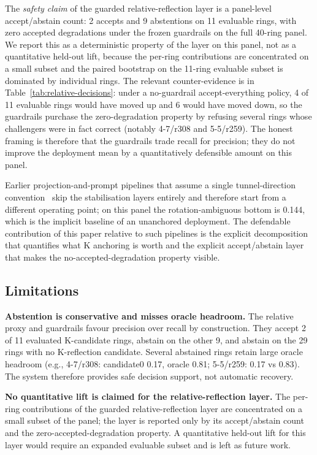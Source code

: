 \documentclass[a4paper,fleqn]{cas-dc}
\begin{document}
The \emph{safety claim} of the guarded relative-reflection layer is a panel-level accept/abstain count: 2 accepts and 9 abstentions on 11 evaluable rings, with zero accepted degradations under the frozen guardrails on the full 40-ring panel. We report this as a deterministic property of the layer on this panel, not as a quantitative held-out lift, because the per-ring contributions are concentrated on a small subset and the paired bootstrap on the 11-ring evaluable subset is dominated by individual rings. The relevant counter-evidence is in Table~\ref{tab:relative-decisions}: under a no-guardrail accept-everything policy, 4 of 11 evaluable rings would have moved up and 6 would have moved down, so the guardrails purchase the zero-degradation property by refusing several rings whose challengers were in fact correct (notably 4-7/r308 and 5-5/r259). The honest framing is therefore that the guardrails trade recall for precision; they do not improve the deployment mean by a quantitatively defensible amount on this panel.

Earlier projection-and-prompt pipelines that assume a single tunnel-direction convention~\cite{ye2025sam4tun} skip the stabilisation layers entirely and therefore start from a different operating point; on this panel the rotation-ambiguous bottom is 0.144, which is the implicit baseline of an unanchored deployment. The defendable contribution of this paper relative to such pipelines is the explicit decomposition that quantifies what K anchoring is worth and the explicit accept/abstain layer that makes the no-accepted-degradation property visible.

\subsection{Limitations}\label{sec:limitations}

\textbf{Abstention is conservative and misses oracle headroom.} The relative proxy and guardrails favour precision over recall by construction. They accept 2 of 11 evaluated K-candidate rings, abstain on the other 9, and abstain on the 29 rings with no K-reflection candidate. Several abstained rings retain large oracle headroom (e.g., 4-7/r308: candidate0 0.17, oracle 0.81; 5-5/r259: 0.17 vs 0.83). The system therefore provides safe decision support, not automatic recovery.

\textbf{No quantitative lift is claimed for the relative-reflection layer.} The per-ring contributions of the guarded relative-reflection layer are concentrated on a small subset of the panel; the layer is reported only by its accept/abstain count and the zero-accepted-degradation property. A quantitative held-out lift for this layer would require an expanded evaluable subset and is left as future work.
\end{document}
